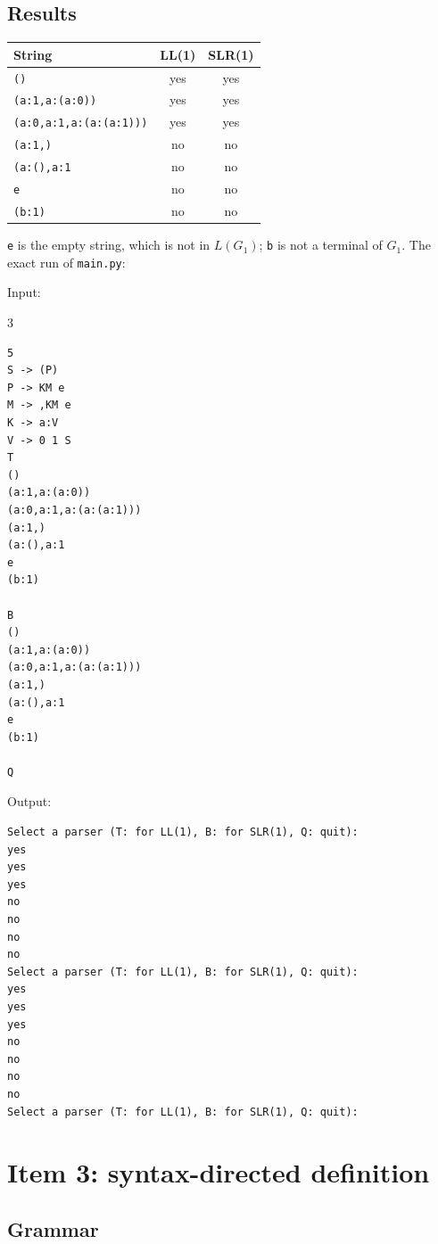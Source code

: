 \documentclass[11pt]{article}
\newcommand{\G}{\ensuremath{G_1}}
\begin{document}
\subsection{Results}

\begin{center}\small
\begin{tabular}{lcc}
\toprule
String & LL(1) & SLR(1) \\
\midrule
\texttt{()} & yes & yes \\
\texttt{(a:1,{}a:(a:0))} & yes & yes \\
\texttt{(a:0,{}a:1,{}a:(a:(a:1)))} & yes & yes \\
\texttt{(a:1,{})} & no & no \\
\texttt{(a:(),{}a:1} & no & no \\
\texttt{e} & no & no \\
\texttt{(b:1)} & no & no \\
\bottomrule
\end{tabular}
\end{center}

\noindent \texttt{e} is the empty string, which is not in $L(\G)$;
\texttt{b} is not a terminal of \G. The exact run of \texttt{main.py}:

{\small
\noindent Input:
\begin{multicols}{3}
\begin{verbatim}
5
S -> (P)
P -> KM e
M -> ,KM e
K -> a:V
V -> 0 1 S
T
()
(a:1,a:(a:0))
(a:0,a:1,a:(a:(a:1)))
(a:1,)
(a:(),a:1
e
(b:1)

B
()
(a:1,a:(a:0))
(a:0,a:1,a:(a:(a:1)))
(a:1,)
(a:(),a:1
e
(b:1)

Q
\end{verbatim}
\end{multicols}
\noindent Output:
\begin{verbatim}
Select a parser (T: for LL(1), B: for SLR(1), Q: quit):
yes
yes
yes
no
no
no
no
Select a parser (T: for LL(1), B: for SLR(1), Q: quit):
yes
yes
yes
no
no
no
no
Select a parser (T: for LL(1), B: for SLR(1), Q: quit):
\end{verbatim}}

\section{Item 3: syntax-directed definition}

\subsection{Grammar}
\end{document}
